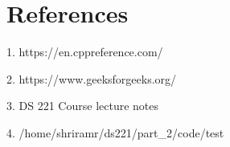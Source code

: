 \documentclass[11pt,a4paper,oneside]{article}
\begin{document}
    \section{References}
    
    \begin{list}{}{}
    	\item 1. https://en.cppreference.com/
    	\item 2. https://www.geeksforgeeks.org/
    	\item 3. DS 221 Course lecture notes
    	\item 4. /home/shriramr/ds221/part\_2/code/test
    \end{list}
\end{document}
